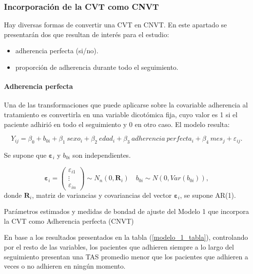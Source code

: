 \documentclass[spanish]{article}
\numberwithin{figure}{subsection}
\numberwithin{equation}{subsection}
\numberwithin{table}{subsection}
\begin{document}
\subsubsection{Incorporación de la CVT como CNVT}

Hay diversas formas de convertir una CVT en CNVT. En este apartado se
presentarán dos que resultan de interés para el estudio:

\begin{itemize}
	\item adherencia perfecta (si/no).
	\item proporción de adherencia durante todo el seguimiento.
\end{itemize}

\paragraph{Adherencia perfecta} \mbox{}

Una de las transformaciones que puede aplicarse sobre la covariable adherencia
al tratamiento es convertirla en una variable dicotómica fija, cuyo valor es 1
si el paciente adhirió en todo el seguimiento y 0 en otro caso. El modelo
resulta:

\begin{equation}
	\label{modelo_1}
	Y_{ij} = \beta_0 + b_{0i} + \beta_1\ sexo_i + \beta_2\ edad_i + \beta_3\ adherencia\ perfecta_i
	+ \beta_4\ mes_j + \varepsilon_{ij}.
\end{equation}

Se supone que $\bm{\varepsilon}_i$ y $b_{0i}$ son independientes.

\[ 
	\bm{\varepsilon}_i = \begin{pmatrix} \varepsilon_{i1} \\ \vdots \\ \varepsilon_{in} \end{pmatrix} \sim N_{n}(0, \bm{R}_i)
	\quad
	b_{0i} \sim N(0, Var(b_{0i})),
\]
donde $\bm{R}_i$, matriz de variancias y covariancias del vector
$\bm{\varepsilon}_{i}$, se supone AR(1).

\begin{table}[H]
	\centering
	\caption{Parámetros estimados y medidas de bondad de ajuste del Modelo 1 que incorpora la CVT como Adherencia perfecta (CNVT)}
	\label{modelo_1_tabla}
	
\end{table}

En base a los resultados presentados en la tabla (\ref{modelo_1_tabla}),
controlando por el resto de las variables, los pacientes que adhieren siempre a
lo largo del seguimiento presentan una TAS promedio menor que los pacientes que
adhieren a veces o no adhieren en ningún momento.
\end{document}
